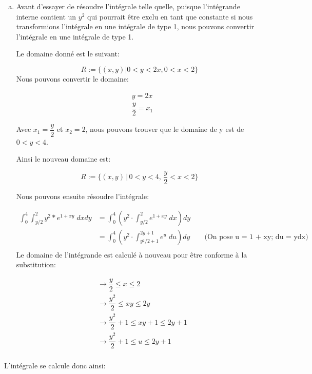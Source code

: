 \documentclass[letterpaper,12pt,oneside,final]{book}
\begin{document}
\begin{enumerate}[a)]
\item %
Avant d'essayer de résoudre l'intégrale telle quelle, puisque l'intégrande interne contient un $y^2$ qui pourrait être exclu en tant que constante si nous transformions l'intégrale en une intégrale de type 1, nous pouvons convertir l'intégrale en une intégrale de type 1.

Le domaine donné est le suivant: 

\begin{equation}
    R := {\{ (x,y) | 0 < y < 2x, 0 < x < 2\}}
\end{equation}
Nous pouvons convertir le domaine: 

\begin{align*}
    & y = 2x \\
    & \dfrac{y}{2} = x_1
\end{align*}

Avec $x_1 = \dfrac{y}{2}$ et $x_2 = 2$, nous pouvons trouver que le domaine de y est de $0 < y < 4$.

Ainsi le nouveau domaine est: 

\begin{equation}
        R := {\{ (x,y)\, |\, 0 < y < 4,\, \dfrac{y}{2} < x < 2\}}
\end{equation}

Nous pouvons ensuite résoudre l'intégrale:

\begin{align*}
   \int_0^4 \int_{y/2}^{2} y^2*e^{1+xy} \; dxdy
   &= \int_0^4 (y^2 \cdot \int_{y/2}^{2} e^{1 + xy} \; dx) dy \\
   &= \int_0^4 (y^2 \cdot \int_{y^2/2 + 1}^{2y + 1} e^{u} \; du) dy \qquad \text{(On pose u = 1 + xy; du = ydx)}  \\
\end{align*}
 Le domaine de l'intégrande est calculé à nouveau pour être conforme à la substitution:
 
 \begin{align*}
    &\rightarrow \dfrac{y}{2} \leq x \leq 2 \\
    &\rightarrow \dfrac{y^2}{2} \leq xy \leq 2y \\
    &\rightarrow \dfrac{y^2}{2} + 1 \leq xy + 1 \leq 2y + 1 \\
    &\rightarrow \dfrac{y^2}{2} + 1 \leq u \leq 2y + 1 \\
 \end{align*}
\end{enumerate}

L'intégrale se calcule donc ainsi:
\end{document}
